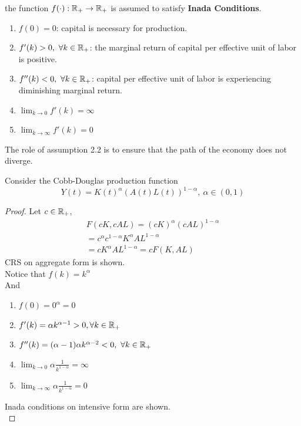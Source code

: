 \documentclass[11pt]{article}
\begin{document}
			\begin{assumption} the function $f(\cdot): \mathbb{R}_+ \rightarrow \mathbb{R}_+$ is assumed to satisfy \textbf{Inada Conditions}.
				\begin{enumerate}
					\item $f(0) = 0$: capital is necessary for production.
					\item $f'(k) > 0,\ \forall k \in \mathbb{R}_+$: the marginal return of capital per effective unit of labor is positive.
					\item $f''(k) < 0,\ \forall k \in \mathbb{R}_+$: capital per effective unit of labor is experiencing diminishing marginal return.
					\item $\lim_{k \to 0}f'(k) = \infty$
					\item $\lim_{k \to \infty}f'(k) = 0$
				\end{enumerate}
			\end{assumption}
			
			\begin{remark}	
			The role of assumption 2.2 is to ensure that the path of the economy does not diverge.
			\end{remark}
			
			\begin{example}
				Consider the Cobb-Douglas production function
				\begin{equation}
					Y(t) = K(t)^\alpha (A(t)L(t))^{1 - \alpha},\ \alpha \in (0, 1)
				\end{equation}
				
				\begin{proof}
					Let $c \in \mathbb{R}_+$, 
					\begin{gather}
						F(cK, cAL) = (cK)^\alpha (cAL)^{1 - \alpha} \\
						= c^\alpha c^{1-\alpha} K^\alpha AL^{1-\alpha} \\
						= cK^{\alpha} AL^{1-\alpha} = cF(K, AL)
					\end{gather}
					CRS on aggregate form is shown. \\
					Notice that $f(k) = k^{\alpha}$ \\
					And 
					\begin{enumerate}
						\item $f(0) = 0^{\alpha} = 0$
						\item $f'(k) = \alpha k ^ {\alpha - 1} > 0, \forall k \in \mathbb{R}_+$
						\item $f''(k) = (\alpha - 1)\alpha k ^ {\alpha - 2} < 0, \ \forall k \in \mathbb{R}_+$
						\item $\lim_{k \to 0} \alpha \frac{1}{k^{1-\alpha}} = \infty$
						\item $\lim_{k \to \infty} \alpha \frac{1}{k^{1-\alpha}} = 0$
					\end{enumerate}
					Inada conditions on intensive form are shown. \\
				\end{proof}
			\end{example}
			
\end{document}
